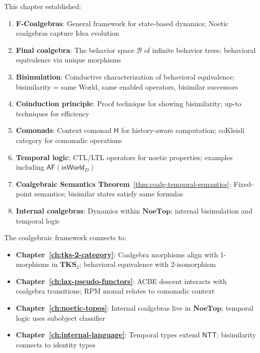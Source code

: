 \begin{remark}
This chapter established:
\begin{enumerate}
  \item \textbf{F-Coalgebras}: General framework for state-based dynamics;
        Noetic coalgebras capture Idea evolution
  \item \textbf{Final coalgebra}: The behavior space $\mathcal{B}$ of infinite
        behavior trees; behavioral equivalence via unique morphisms
  \item \textbf{Bisimulation}: Coinductive characterization of behavioral equivalence;
        bisimilarity = same World, same enabled operators, bisimilar successors
  \item \textbf{Coinduction principle}: Proof technique for showing bisimilarity;
        up-to techniques for efficiency
  \item \textbf{Comonads}: Context comonad $\mathsf{H}$ for history-aware computation;
        coKleisli category for comonadic operations
  \item \textbf{Temporal logic}: CTL/LTL operators for noetic properties;
        examples including $\mathsf{AF}(\mathsf{inWorld}_D)$
  \item \textbf{Coalgebraic Semantics Theorem}~\ref{thm:coalg-temporal-semantics}:
        Fixed-point semantics; bisimilar states satisfy same formulas
  \item \textbf{Internal coalgebras}: Dynamics within $\mathbf{NoeTop}$;
        internal bisimulation and temporal logic
\end{enumerate}
\end{remark}

\begin{remark}
The coalgebraic framework connects to:
\begin{itemize}
  \item \textbf{Chapter~\ref{ch:tks-2-category}}: Coalgebra morphisms align with
        1-morphisms in $\mathbf{TKS}_2$; behavioral equivalence with 2-isomorphism
  \item \textbf{Chapter~\ref{ch:lax-pseudo-functors}}: ACBE descent interacts with
        coalgebra transitions; RPM monad relates to comonadic context
  \item \textbf{Chapter~\ref{ch:noetic-topos}}: Internal coalgebras live in
        $\mathbf{NoeTop}$; temporal logic uses subobject classifier
  \item \textbf{Chapter~\ref{ch:internal-language}}: Temporal types extend
        $\mathsf{NTT}$; bisimilarity connects to identity types
\end{itemize}
\end{remark}

